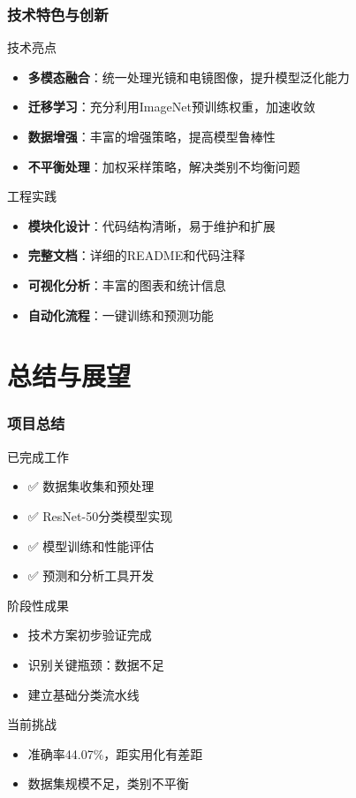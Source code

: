 \documentclass[10pt]{beamer}
\begin{document}
\begin{frame}
\frametitle{技术特色与创新}
\begin{block}{技术亮点}
\begin{itemize}
    \item \textbf{多模态融合}：统一处理光镜和电镜图像，提升模型泛化能力
    \item \textbf{迁移学习}：充分利用ImageNet预训练权重，加速收敛
    \item \textbf{数据增强}：丰富的增强策略，提高模型鲁棒性
    \item \textbf{不平衡处理}：加权采样策略，解决类别不均衡问题
\end{itemize}
\end{block}

\begin{block}{工程实践}
\begin{itemize}
    \item \textbf{模块化设计}：代码结构清晰，易于维护和扩展
    \item \textbf{完整文档}：详细的README和代码注释
    \item \textbf{可视化分析}：丰富的图表和统计信息
    \item \textbf{自动化流程}：一键训练和预测功能
\end{itemize}
\end{block}
\end{frame}

\section{总结与展望}

\begin{frame}
\frametitle{项目总结}
\begin{block}{已完成工作}
\begin{itemize}
    \item ✅ 数据集收集和预处理
    \item ✅ ResNet-50分类模型实现
    \item ✅ 模型训练和性能评估
    \item ✅ 预测和分析工具开发
\end{itemize}
\end{block}

\begin{block}{阶段性成果}
\begin{itemize}
    \item 技术方案初步验证完成
    \item 识别关键瓶颈：数据不足
    \item 建立基础分类流水线
\end{itemize}
\end{block}

\begin{alertblock}{当前挑战}
\begin{itemize}
    \item 准确率44.07\%，距实用化有差距
    \item 数据集规模不足，类别不平衡
\end{itemize}
\end{alertblock}
\end{frame}
\end{document}
